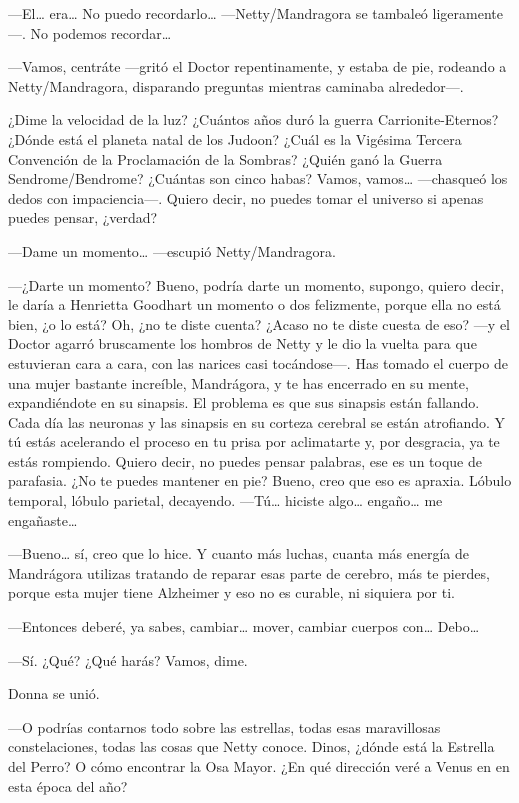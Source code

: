 ---El\ldots{} era\ldots{} No puedo recordarlo\ldots{}
---Netty/Mandragora se tambaleó ligeramente---. No podemos
recordar\ldots{}

---Vamos, centráte ---gritó el Doctor repentinamente, y estaba de pie,
rodeando a Netty/Mandragora, disparando preguntas mientras caminaba
alrededor---.

¿Dime la velocidad de la luz? ¿Cuántos años duró la guerra
Carrionite-Eternos? ¿Dónde está el planeta natal de los Judoon? ¿Cuál
es la Vigésima Tercera Convención de la Proclamación de la Sombras?
¿Quién ganó la Guerra Sendrome/Bendrome? ¿Cuántas son cinco habas?
Vamos, vamos\ldots{} ---chasqueó los dedos con impaciencia---. Quiero
decir, no puedes tomar el universo si apenas puedes pensar, ¿verdad?

---Dame un momento\ldots{} ---escupió Netty/Mandragora.

---¿Darte un momento? Bueno, podría darte un momento, supongo, quiero
decir, le daría a Henrietta Goodhart un momento o dos felizmente, porque
ella no está bien, ¿o lo está? Oh, ¿no te diste cuenta? ¿Acaso no te
diste cuesta de eso? ---y el Doctor agarró bruscamente los hombros de
Netty y le dio la vuelta para que estuvieran cara a cara, con las
narices casi tocándose---. Has tomado el cuerpo de una mujer bastante
increíble, Mandrágora, y te has encerrado en su mente, expandiéndote en
su sinapsis. El problema es que sus sinapsis están fallando. Cada día
las neuronas y las sinapsis en su corteza cerebral se están atrofiando.
Y tú estás acelerando el proceso en tu prisa por aclimatarte y, por
desgracia, ya te estás rompiendo. Quiero decir, no puedes pensar
palabras, ese es un toque de parafasia. ¿No te puedes mantener en pie?
Bueno, creo que eso es apraxia. Lóbulo temporal, lóbulo parietal,
decayendo. ---Tú\ldots{} hiciste algo\ldots{} engaño\ldots{} me
engañaste\ldots{}

---Bueno\ldots{} sí, creo que lo hice. Y cuanto más luchas, cuanta más
energía de Mandrágora utilizas tratando de reparar esas parte de
cerebro, más te pierdes, porque esta mujer tiene Alzheimer y eso no es
curable, ni siquiera por ti.

---Entonces deberé, ya sabes, cambiar\ldots{} mover, cambiar cuerpos
con\ldots{} Debo\ldots{}

---Sí. ¿Qué? ¿Qué harás? Vamos, dime.

Donna se unió.

---O podrías contarnos todo sobre las estrellas, todas esas maravillosas
constelaciones, todas las cosas que Netty conoce. Dinos, ¿dónde está la
Estrella del Perro? O cómo encontrar la Osa Mayor. ¿En qué dirección
veré a Venus en en esta época del año?

